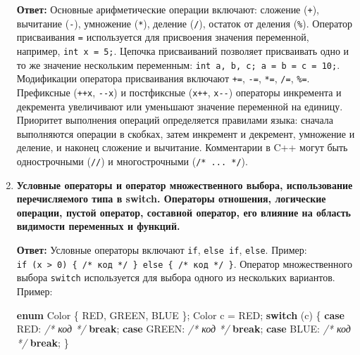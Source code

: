\documentclass[
]{article}
\newenvironment{Shaded}{}{}
\newcommand{\CommentTok}[1]{\textcolor[rgb]{0.38,0.63,0.69}{\textit{#1}}}
\newcommand{\ControlFlowTok}[1]{\textcolor[rgb]{0.00,0.44,0.13}{\textbf{#1}}}
\newcommand{\KeywordTok}[1]{\textcolor[rgb]{0.00,0.44,0.13}{\textbf{#1}}}
\newcommand{\NormalTok}[1]{#1}
\newcommand{\OperatorTok}[1]{\textcolor[rgb]{0.40,0.40,0.40}{#1}}
\begin{document}
\begin{enumerate}
  \textbf{Ответ:} Основные арифметические операции включают: сложение
  (\texttt{+}), вычитание (\texttt{-}), умножение (\texttt{*}), деление
  (\texttt{/}), остаток от деления (\texttt{\%}). Оператор присваивания
  \texttt{=} используется для присвоения значения переменной, например,
  \texttt{int\ x\ =\ 5;}. Цепочка присваиваний позволяет присваивать
  одно и то же значение нескольким переменным:
  \texttt{int\ a,\ b,\ c;\ a\ =\ b\ =\ c\ =\ 10;}. Модификации оператора
  присваивания включают \texttt{+=}, \texttt{-=}, \texttt{*=},
  \texttt{/=}, \texttt{\%=}. Префиксные (\texttt{++x}, \texttt{-\/-x}) и
  постфиксные (\texttt{x++}, \texttt{x-\/-}) операторы инкремента и
  декремента увеличивают или уменьшают значение переменной на единицу.
  Приоритет выполнения операций определяется правилами языка: сначала
  выполняются операции в скобках, затем инкремент и декремент, умножение
  и деление, и наконец сложение и вычитание. Комментарии в C++ могут
  быть однострочными (\texttt{//}) и многострочными
  (\texttt{/*\ ...\ */}).
\item
  \textbf{Условные операторы и оператор множественного выбора,
  использование перечисляемого типа в switch. Операторы отношения,
  логические операции, пустой оператор, составной оператор, его влияние
  на область видимости переменных и функций.}

  \textbf{Ответ:} Условные операторы включают \texttt{if},
  \texttt{else\ if}, \texttt{else}. Пример:
  \texttt{if\ (x\ \textgreater{}\ 0)\ \{\ /*\ код\ */\ \}\ else\ \{\ /*\ код\ */\ \}}.
  Оператор множественного выбора \texttt{switch} используется для выбора
  одного из нескольких вариантов. Пример:

\begin{Shaded}
\begin{Highlighting}[]
\KeywordTok{enum}\NormalTok{ Color }\OperatorTok{\{}\NormalTok{ RED}\OperatorTok{,}\NormalTok{ GREEN}\OperatorTok{,}\NormalTok{ BLUE }\OperatorTok{\};}
\NormalTok{Color c }\OperatorTok{=}\NormalTok{ RED}\OperatorTok{;}
\ControlFlowTok{switch} \OperatorTok{(}\NormalTok{c}\OperatorTok{)} \OperatorTok{\{}
    \ControlFlowTok{case}\NormalTok{ RED}\OperatorTok{:} \CommentTok{/* код */} \ControlFlowTok{break}\OperatorTok{;}
    \ControlFlowTok{case}\NormalTok{ GREEN}\OperatorTok{:} \CommentTok{/* код */} \ControlFlowTok{break}\OperatorTok{;}
    \ControlFlowTok{case}\NormalTok{ BLUE}\OperatorTok{:} \CommentTok{/* код */} \ControlFlowTok{break}\OperatorTok{;}
\OperatorTok{\}}
\end{Highlighting}
\end{Shaded}


\end{enumerate}
\end{document}
